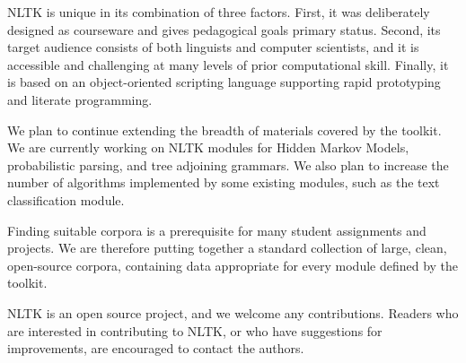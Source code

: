 \documentclass[11pt]{article}
\begin{document}
NLTK is unique in its combination of three factors.
First, it was deliberately designed as courseware and gives pedagogical
goals primary status.  Second, its target audience consists of both
linguists and computer scientists, and it is accessible and challenging
at many levels of prior computational skill.  Finally, it is based on
an object-oriented scripting language supporting rapid prototyping and
literate programming.


We plan to continue extending the breadth of materials covered by the
toolkit.  We are currently working on NLTK modules for Hidden Markov
Models, probabilistic parsing, and tree adjoining grammars.  We also
plan to increase the number of algorithms implemented by some existing
modules, such as the text classification module.

Finding suitable corpora is a prerequisite for many student
assignments and projects.  We are therefore putting together a
standard collection of large, clean, open-source corpora, containing
data appropriate for every module defined by the toolkit.

NLTK is an open source project, and we welcome any contributions.
Readers who are interested in contributing to NLTK, or who have
suggestions for improvements, are encouraged to contact the authors.




\end{document}
